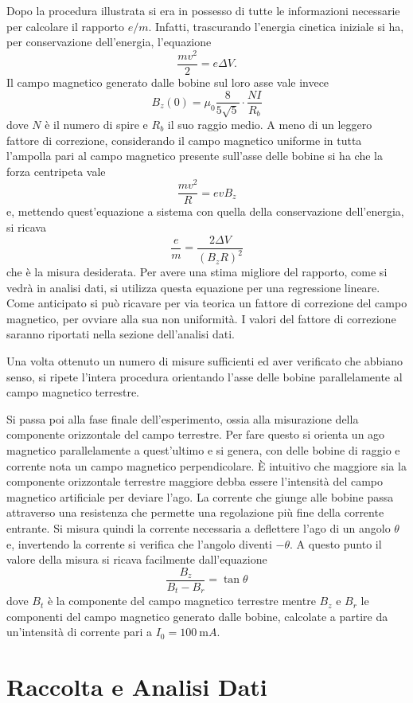 \documentclass[a4paper,11pt]{article}
\begin{document}
		Dopo la procedura illustrata si era in possesso di tutte le informazioni necessarie per calcolare il rapporto $e / m $. Infatti, trascurando l'energia cinetica iniziale si ha, per conservazione dell'energia, l'equazione $$ \frac{mv^2}{2} = e \Delta V.$$ Il campo magnetico generato dalle bobine sul loro asse vale invece $$ B _z (0) = \mu _0 \frac{8}{5 \sqrt{5}} \cdot \frac{NI}{R_b}$$ dove $N$ è il numero di spire e $R_b$ il suo raggio medio. A meno di un leggero fattore di correzione, considerando il campo magnetico uniforme in tutta l'ampolla pari al campo magnetico presente sull'asse delle bobine si ha che la forza centripeta vale $$\frac{m v^2}{R} = evB_z$$ e, mettendo quest'equazione a sistema con quella della conservazione dell'energia, si ricava $$\frac{e}{m} = \frac{2 \Delta V}{(B _z R)^2}$$ che è la misura desiderata. Per avere una stima migliore del rapporto, come si vedrà in analisi dati, si utilizza questa equazione per una regressione lineare. Come anticipato si può ricavare per via teorica un fattore di correzione del campo magnetico, per ovviare alla sua non uniformità. I valori del fattore di correzione saranno riportati nella sezione dell'analisi dati.
		
		Una volta ottenuto un numero di misure sufficienti ed aver verificato che abbiano senso, si ripete l'intera procedura orientando l'asse delle bobine parallelamente al campo magnetico terrestre.
		
		Si passa poi alla fase finale dell'esperimento, ossia alla misurazione della componente orizzontale del campo terrestre. Per fare questo si orienta un ago magnetico parallelamente a quest'ultimo e si genera, con delle bobine di raggio e corrente nota un campo magnetico perpendicolare. È intuitivo che maggiore sia la componente orizzontale terrestre maggiore debba essere l'intensità del campo magnetico artificiale per deviare l'ago. La corrente che giunge alle bobine passa attraverso una resistenza che permette una regolazione più fine della corrente entrante. Si misura quindi la corrente necessaria a deflettere l'ago di un angolo $\theta$ e, invertendo la corrente si verifica che l'angolo diventi $-	\theta$. A questo punto il valore della misura si ricava facilmente dall'equazione $$\frac{B_z}{B_t - B_r} = \tan \theta$$ dove $B_t$ è la componente del campo magnetico terrestre mentre $B _z$ e $B_ r$ le componenti del campo magnetico generato dalle bobine, calcolate a partire da un'intensità di corrente pari a $I _0 = \SI{100}{\milli A}$.
		
		\section{Raccolta e Analisi Dati}
		
\end{document}
